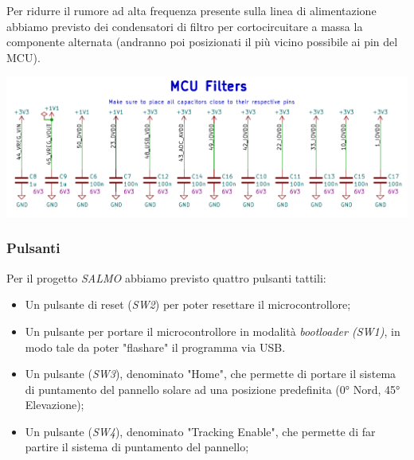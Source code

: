 \noindent Per ridurre il rumore ad alta frequenza presente sulla linea di
alimentazione abbiamo previsto dei condensatori di filtro per
cortocircuitare a massa la componente alternata (andranno poi
posizionati il più vicino possibile ai pin del MCU).

\begin{center}
\includegraphics[scale=0.55]{figures/image23.png}
\captionsetup{type=figure}
\end{center}

\hypertarget{pulsanti}{%
\subsubsection{\texorpdfstring{\hfill\break
Pulsanti}{ Pulsanti}}\label{pulsanti}}

Per il progetto \emph{SALMO} abbiamo previsto quattro pulsanti tattili:

\begin{itemize}
\item
  
  Un pulsante di reset (\emph{SW2}) per poter resettare il
  microcontrollore;
  
\item
  
  Un pulsante per portare il microcontrollore in modalità
  \emph{bootloader (SW1)}, in modo tale da poter "flashare" il
  programma via USB.
  
\item
  
  Un pulsante (\emph{SW3}), denominato "Home", che permette di portare
  il sistema di puntamento del pannello solare ad una posizione
  predefinita (0° Nord, 45° Elevazione);
  
\item
  
  Un pulsante (\emph{SW4}), denominato "Tracking Enable", che permette
  di far partire il sistema di puntamento del pannello;
  
\end{itemize}

